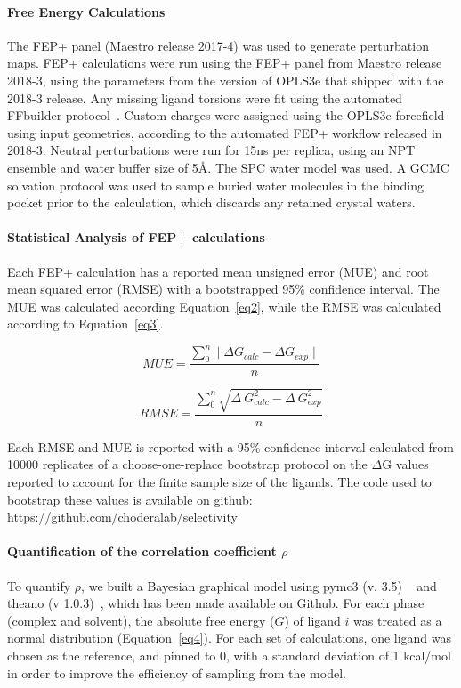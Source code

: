 \documentclass[9pt,lineno]{elife-modified} %
\begin{document}
\paragraph{Free Energy Calculations}
The FEP+ panel (Maestro release 2017-4) was used to generate perturbation maps. FEP+ calculations were run using the FEP+ panel from Maestro release 2018-3, using the parameters from the version of OPLS3e that shipped with the 2018-3 release. Any missing ligand torsions were fit using the automated FFbuilder protocol~\citep{Abel:Acc.Chem.Res.:2017}. Custom charges were assigned using the OPLS3e forcefield using input geometries, according to the automated FEP+ workflow released in 2018-3. Neutral perturbations were run for 15ns per replica, using an NPT ensemble and water buffer size of 5\AA. The SPC water model was used. A GCMC solvation protocol was used to sample buried water molecules in the binding pocket prior to the calculation, which discards any retained crystal waters. 

\paragraph{Statistical Analysis of FEP+ calculations}
Each FEP+ calculation has a reported mean unsigned error (MUE) and root mean squared error (RMSE) with a bootstrapped 95\% confidence interval. The MUE was calculated according Equation~\ref{eq2}, while the RMSE was calculated according to Equation~\ref{eq3}. 

\begin{equation}\label{eq2}
MUE = \frac{ \sum_{0}^{n} \mid \Delta G _{calc} - \Delta G _{exp} \mid}{n}
 \end{equation}
 
 \begin{equation}\label{eq3}
RMSE = \frac{ \sum_{0}^{n} \sqrt{\Delta~G_{calc}^2 - \Delta~G_{exp}^2}}{n} 
 \end{equation}
 
 Each RMSE and MUE is reported with a 95\% confidence interval calculated from 10000 replicates of a choose-one-replace bootstrap protocol on the $\Delta$G values reported to account for the finite sample size of the ligands. The code used to bootstrap these values is available on github: https://github.com/choderalab/selectivity
 
 \paragraph{Quantification of the correlation coefficient $\rho$}
 To quantify $\rho$, we built a Bayesian graphical model using pymc3 (v. 3.5) ~\citep{Salvatier:2016ki} and theano (v 1.0.3)~\citep{2016arXiv160502688full}, which has been made available on Github. For each phase (complex and solvent), the absolute free energy ($G$) of ligand $i$ was treated as a normal distribution (Equation~\ref{eq4}). For each set of calculations, one ligand was chosen as the reference, and pinned to 0, with a standard deviation of 1 kcal/mol in order to improve the efficiency of sampling from the model.
 
\end{document}
